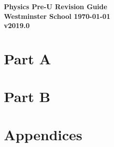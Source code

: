 \documentclass[a4paper,11pt,twoside]{memoir}
\newcommand{\theversion}{v2019.0}
\newcounter{spec}[chapter]
\begin{document}
\raggedbottom
\frontmatter
\begin{titlingpage}
    \vspace*{\fill}
    \begin{center}\Huge\bfseries Physics Pre-U Revision Guide \\ \vspace{3cm} \Large Westminster School
    \vfill \today \\ \theversion \end{center}
	\thispagestyle{empty}
\end{titlingpage}

\tableofcontents



\mainmatter
\part*{Part A}









\part*{Part B}











\appendix
\part*{Appendices}



\backmatter
\end{document}
